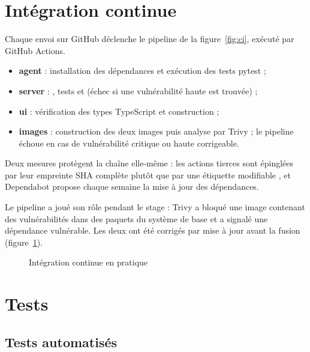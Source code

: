 \section{Intégration continue}

Chaque envoi sur GitHub déclenche le pipeline de la figure~\ref{fig:ci}, exécuté par GitHub
Actions.


\begin{itemize}
  \item \textbf{agent} : installation des dépendances et exécution des tests pytest ;
  \item \textbf{server} : , tests et  (échec si une vulnérabilité
        haute est trouvée) ;
  \item \textbf{ui} : vérification des types TypeScript et construction ;
  \item \textbf{images} : construction des deux images puis analyse par Trivy \cite{trivy} ;
        le pipeline échoue en cas de vulnérabilité critique ou haute corrigeable.
\end{itemize}

Deux mesures protègent la chaîne elle-même : les actions tierces sont épinglées par leur
empreinte SHA complète plutôt que par une étiquette modifiable \cite{ghhardening}, et
Dependabot \cite{dependabot} propose chaque semaine la mise à jour des dépendances.

Le pipeline a joué son rôle pendant le stage : Trivy a bloqué une image contenant des
vulnérabilités dans des paquets du système de base et  a signalé une dépendance
vulnérable. Les deux ont été corrigés par mise à jour avant la fusion
(figure~\ref{fig:ci-captures}).

\begin{figure}[htbp]
\centering
{}\hfill
{}
\caption{Intégration continue en pratique}
\label{fig:ci-captures}
\end{figure}

\section{Tests}

\subsection{Tests automatisés}

